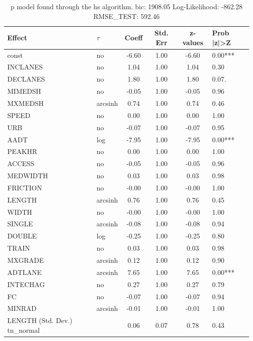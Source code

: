 \begin{table}
	\caption{p model found through the hs algorithm. bic: 1908.05 Log-Likelihood: -862.28 RMSE_TEST: 592.46}
	\begin{center}
		\begin{tabular}{|l|l|c|c|c|l|}
			\hline
			Effect & $\tau$ & Coeff & Std. Err & z-values & Prob |z|>Z \\
			\hline
			const & no & -6.60 & 1.00 & -6.60 & 0.00*** \\
			\hline
			INCLANES & no & 1.04 & 1.00 & 1.04 & 0.30 \\
			\hline
			DECLANES & no & 1.80 & 1.00 & 1.80 & 0.07. \\
			\hline
			MIMEDSH & no & -0.05 & 1.00 & -0.05 & 0.96 \\
			\hline
			MXMEDSH & arcsinh & 0.74 & 1.00 & 0.74 & 0.46 \\
			\hline
			SPEED & no & 0.00 & 1.00 & 0.00 & 1.00 \\
			\hline
			URB & no & -0.07 & 1.00 & -0.07 & 0.95 \\
			\hline
			AADT & log & -7.95 & 1.00 & -7.95 & 0.00*** \\
			\hline
			PEAKHR & no & 0.00 & 1.00 & 0.00 & 1.00 \\
			\hline
			ACCESS & no & -0.05 & 1.00 & -0.05 & 0.96 \\
			\hline
			MEDWIDTH & no & 0.03 & 1.00 & 0.03 & 0.98 \\
			\hline
			FRICTION & no & -0.00 & 1.00 & -0.00 & 1.00 \\
			\hline
			LENGTH & arcsinh & 0.76 & 1.00 & 0.76 & 0.45 \\
			\hline
			WIDTH & no & -0.00 & 1.00 & -0.00 & 1.00 \\
			\hline
			SINGLE & arcsinh & -0.08 & 1.00 & -0.08 & 0.94 \\
			\hline
			DOUBLE & log & -0.25 & 1.00 & -0.25 & 0.80 \\
			\hline
			TRAIN & no & 0.03 & 1.00 & 0.03 & 0.98 \\
			\hline
			MXGRADE & arcsinh & 0.12 & 1.00 & 0.12 & 0.90 \\
			\hline
			ADTLANE & arcsinh & 7.65 & 1.00 & 7.65 & 0.00*** \\
			\hline
			INTECHAG & no & 0.27 & 1.00 & 0.27 & 0.79 \\
			\hline
			FC & no & -0.07 & 1.00 & -0.07 & 0.94 \\
			\hline
			MINRAD & arcsinh & -0.01 & 1.00 & -0.01 & 1.00 \\
			\hline
			LENGTH (Std. Dev.) tn_normal &  & 0.06 & 0.07 & 0.78 & 0.43 \\

\end{tabular}
\end{center}
\end{table}
